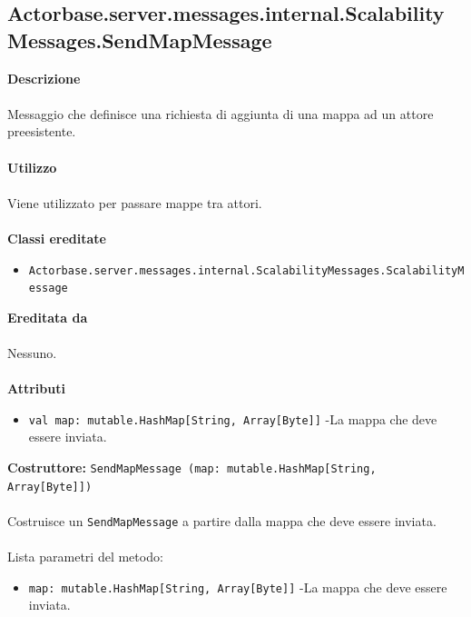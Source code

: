 \documentclass[a4paper]{article}
\begin{document}
	\subsection{Actorbase.server.messages.internal.ScalabilityMessages.SendMapMessage}
		\textbf{Descrizione}
			\\ \\
			Messaggio che definisce una richiesta di aggiunta di una mappa ad un attore preesistente.
			\\ \\
		\textbf{Utilizzo}
			\\ \\
			Viene utilizzato per passare mappe tra attori.
			\\ \\
		\textbf{Classi ereditate}
			\begin{itemize}
				\item \texttt{Actorbase.server.messages.internal.ScalabilityMessages.ScalabilityMessage}
			\end{itemize}
		\textbf{Ereditata da}
			\\ \\
			Nessuno.
			\\ \\
		\textbf{Attributi}
			\begin{itemize}
				\item \texttt{val map: mutable.HashMap[String, Array[Byte]]} -La mappa che deve essere inviata.
			\end{itemize}
		\textbf{Costruttore:} \texttt{SendMapMessage (map: mutable.HashMap[String, Array[Byte]])}
		\\ \\
		Costruisce un \texttt{SendMapMessage} a partire dalla mappa che deve essere inviata.
		\\ \\
		Lista parametri del metodo:
			\begin{itemize}
				\item \texttt{map: mutable.HashMap[String, Array[Byte]]} -La mappa che deve essere inviata.
			\end{itemize}
			
\end{document}
